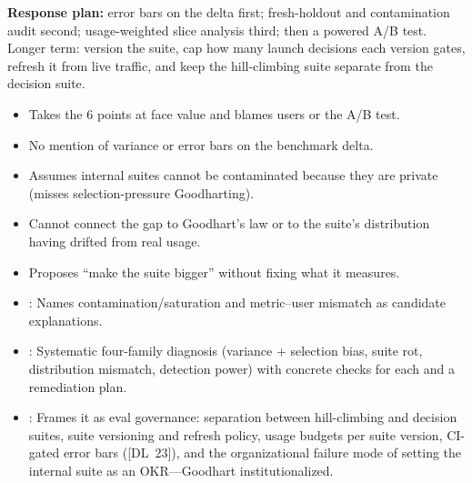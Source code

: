 \begin{interviewq}
\textbf{Response plan:} error bars on the delta first; fresh-holdout and
contamination audit second; usage-weighted slice analysis third; then a
powered A/B test.  Longer term: version the suite, cap how many launch
decisions each version gates, refresh it from live traffic, and keep the
hill-climbing suite separate from the decision suite.

\redflags
\begin{itemize}
    \item Takes the 6 points at face value and blames users or the A/B test.
    \item No mention of variance or error bars on the benchmark delta.
    \item Assumes internal suites cannot be contaminated because they are
          private (misses selection-pressure Goodharting).
    \item Cannot connect the gap to Goodhart's law or to the suite's
          distribution having drifted from real usage.
    \item Proposes ``make the suite bigger'' without fixing what it measures.
\end{itemize}


\goodgreat
\begin{itemize}
    \item {}: Names contamination/saturation and metric--user
          mismatch as candidate explanations.
    \item {}: Systematic four-family diagnosis (variance +
          selection bias, suite rot, distribution mismatch, detection power)
          with concrete checks for each and a remediation plan.
    \item {}: Frames it as eval governance: separation between
          hill-climbing and decision suites, suite versioning and refresh
          policy, usage budgets per suite version, CI-gated error bars
          ([DL~23]), and the organizational failure mode of setting the
          internal suite as an OKR---Goodhart institutionalized.
\end{itemize}

\end{interviewq}

